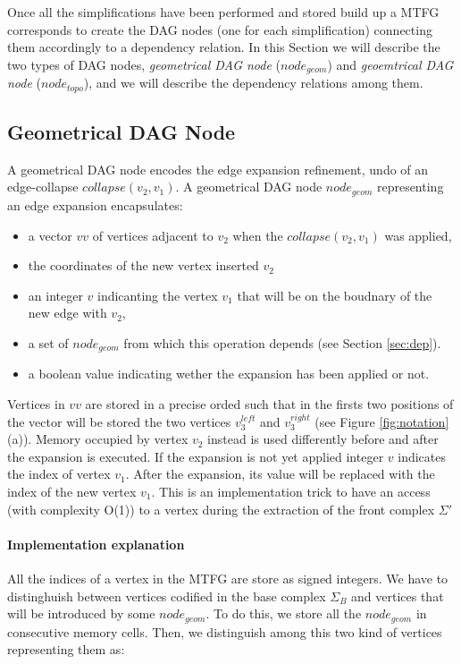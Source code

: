 \documentclass[preprint,5p,times,onecolumn]{article}
\begin{document}
Once all the simplifications have been performed and stored build up a MTFG corresponds to create the DAG nodes (one for each simplification) connecting them accordingly to a dependency relation. In this Section we will describe the two types of DAG nodes, {\em geometrical DAG node} ($node_{geom}$) and {\em geoemtrical DAG node} ($node_{topo}$), and we will describe the dependency relations among them.
\subsection{Geometrical DAG Node}

A geometrical DAG node encodes the edge expansion refinement, undo of an edge-collapse $collapse(v_2,v_1)$. A geometrical DAG node $node_{geom}$ representing an edge expansion encapsulates:

\begin{itemize}
	\item a vector $vv$ of vertices adjacent to $v_2$ when the $collapse(v_2,v_1)$ was applied,
	\item the coordinates of the new vertex inserted $v_2$
	\item an integer $v$ indicanting the vertex $v_1$ that will be on the boudnary of the new edge with $v_2$,
	\item a set of $node_{geom}$ from which this operation depends (see Section \ref{sec:dep}).
	\item a boolean value indicating wether the expansion has been applied or not.
\end{itemize}

Vertices in $vv$ are stored in a precise orded such that in the firsts two positions of the vector will be stored the two vertices $v_3^{left}$ and $v_3^{right}$ (see Figure \ref{fig:notation}(a)).  
Memory occupied by vertex $v_2$ instead is used differently before and after the expansion is executed. If the expansion is not yet applied integer $v$ indicates the index of vertex $v_1$. After the expansion, its value will be replaced with the index of the new vertex $v_1$. This is an implementation trick to have an access (with complexity O(1)) to a vertex during the extraction of the front complex $\Sigma'$\\

\paragraph{Implementation explanation}
All the indices of a vertex in the MTFG are store as signed integers. We have to distinghuish between vertices codified in the base complex $\Sigma_B$ and vertices that will be introduced by some $node_{geom}$. To do this, we store all the $node_{geom}$ in consecutive memory cells. Then, we distinguish among this two kind of vertices representing them as:
\end{document}

